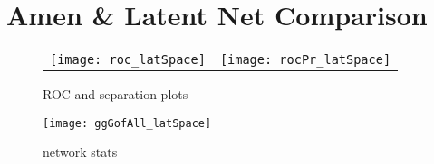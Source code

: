 \section{Amen \& Latent Net Comparison}





\begin{figure}[ht]
	\centering
	\begin{tabular}{cc}
	\texttt{[image: roc\_latSpace]} & 
	\texttt{[image: rocPr\_latSpace]}
	\end{tabular}
	\caption{ROC and separation plots}
	\label{fig:roc_latentSpace}
\end{figure}

\begin{figure}[ht]
	\centering
	\texttt{[image: ggGofAll\_latSpace]}
	\caption{network stats }
	\label{fig:gofAll_latSpace}
\end{figure}